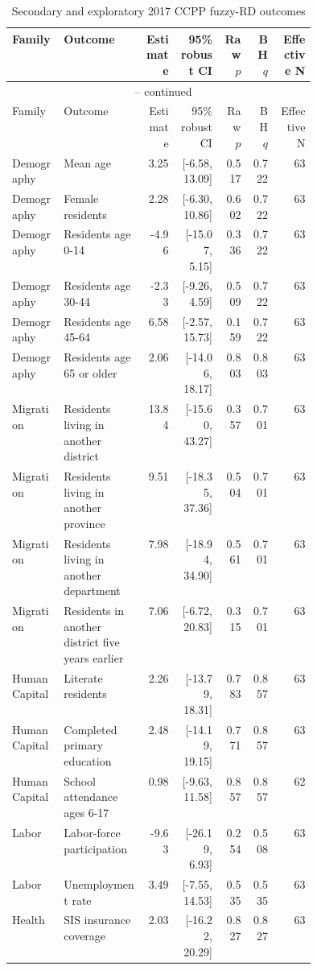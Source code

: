 \begin{longtable}{p{0.17\linewidth}p{0.27\linewidth}rrrrr}
\caption{Secondary and exploratory 2017 CCPP fuzzy-RD outcomes}
\label{tab:rd_outcomes_secondary_2017_ccpp} \\
\toprule
Family & Outcome & Estimate & 95\% robust CI & Raw \(p\) & BH \(q\) & Effective N \\
\midrule
\endfirsthead
\multicolumn{7}{c}{\tablename\ \thetable{} -- continued} \\
\toprule
Family & Outcome & Estimate & 95\% robust CI & Raw \(p\) & BH \(q\) & Effective N \\
\midrule
\endhead
Demography & Mean age & 3.25 & [-6.58, 13.09] & 0.517 & 0.722 & 63 \\
Demography & Female residents & 2.28 & [-6.30, 10.86] & 0.602 & 0.722 & 63 \\
Demography & Residents age 0-14 & -4.96 & [-15.07, 5.15] & 0.336 & 0.722 & 63 \\
Demography & Residents age 30-44 & -2.33 & [-9.26, 4.59] & 0.509 & 0.722 & 63 \\
Demography & Residents age 45-64 & 6.58 & [-2.57, 15.73] & 0.159 & 0.722 & 63 \\
Demography & Residents age 65 or older & 2.06 & [-14.06, 18.17] & 0.803 & 0.803 & 63 \\
Migration & Residents living in another district & 13.84 & [-15.60, 43.27] & 0.357 & 0.701 & 63 \\
Migration & Residents living in another province & 9.51 & [-18.35, 37.36] & 0.504 & 0.701 & 63 \\
Migration & Residents living in another department & 7.98 & [-18.94, 34.90] & 0.561 & 0.701 & 63 \\
Migration & Residents in another district five years earlier & 7.06 & [-6.72, 20.83] & 0.315 & 0.701 & 63 \\
Human Capital & Literate residents & 2.26 & [-13.79, 18.31] & 0.783 & 0.857 & 63 \\
Human Capital & Completed primary education & 2.48 & [-14.19, 19.15] & 0.771 & 0.857 & 63 \\
Human Capital & School attendance ages 6-17 & 0.98 & [-9.63, 11.58] & 0.857 & 0.857 & 62 \\
Labor & Labor-force participation & -9.63 & [-26.19, 6.93] & 0.254 & 0.508 & 63 \\
Labor & Unemployment rate & 3.49 & [-7.55, 14.53] & 0.535 & 0.535 & 63 \\
Health & SIS insurance coverage & 2.03 & [-16.22, 20.29] & 0.827 & 0.827 & 63 \\

\end{longtable}
